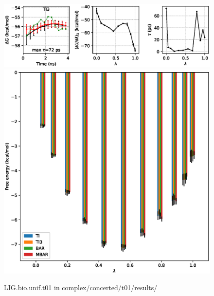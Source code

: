 \documentclass[journal=jctcce,manuscript=article,hyperref=false]{achemso}
\begin{document}
\clearpage
\pagebreak
\begin{figure}
\includegraphics[clip,width=6in]{complex.concerted.t01.results..GvsT.eps}\vspace{-0.3cm}
\includegraphics[clip,width=6in]{complex.concerted.t01.results..GvsL.eps}\vspace{-0.3cm}
\caption{LIG.bio.unif.t01 in complex/concerted/t01/results/}
\end{figure}
\end{document}
